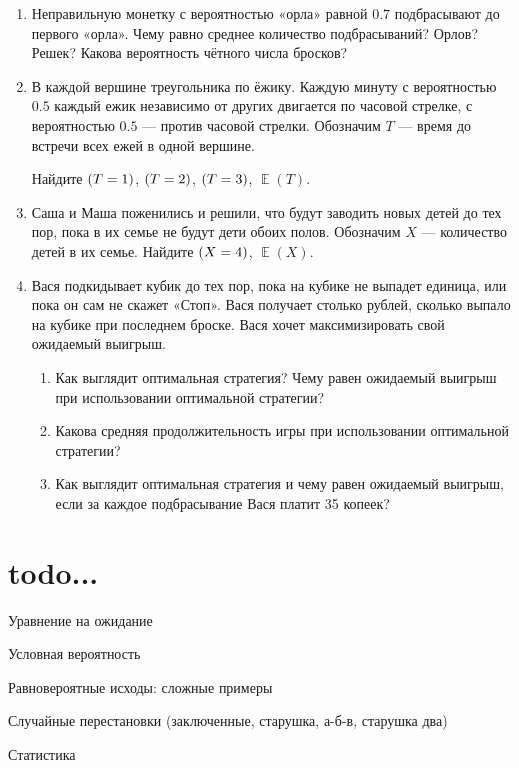 \documentclass[12pt]{article}
\DeclareMathOperator{\E}{\mathbb{E}}
\let\P\relax
\DeclareMathOperator{\P}{\mathbb{P}}
\theoremstyle{definition}
\begin{document}
\begin{enumerate}
\item  Неправильную монетку с вероятностью «орла» равной $0.7$ подбрасывают до первого «орла».
Чему равно среднее количество подбрасываний?  Орлов? Решек? Какова вероятность чётного числа бросков? 

\item В каждой вершине треугольника по ёжику. Каждую минуту с вероятностью $0.5$ каждый ежик
независимо от других двигается по часовой стрелке, с вероятностью
$0.5$ — против часовой стрелки.
Обозначим $T$ — время до встречи всех ежей в одной вершине.

Найдите $\P(T=1)$, $\P(T=2)$, $\P(T=3)$, $\E(T)$.

\item Саша и Маша поженились и решили, что будут заводить новых детей до тех пор,
пока в их семье не будут дети обоих полов. Обозначим $X$ — количество детей в их семье.
Найдите $\P(X=4)$, $\E(X)$.

\item Вася подкидывает кубик до тех пор, пока на кубике не выпадет единица, или пока он сам не скажет «Стоп». 
Вася получает столько рублей, сколько выпало на кубике при последнем броске. 
Вася хочет максимизировать свой ожидаемый выигрыш.
\begin{enumerate}
\item Как выглядит оптимальная стратегия? Чему равен ожидаемый выигрыш при использовании оптимальной стратегии?
\item Какова средняя продолжительность игры при использовании оптимальной стратегии?
\item Как выглядит оптимальная стратегия и чему равен ожидаемый выигрыш, если за каждое
подбрасывание Вася платит 35 копеек?
\end{enumerate}

\end{enumerate}
\newpage





\section{todo...}

Уравнение на ожидание

Условная вероятность

Равновероятные исходы: сложные примеры

Случайные перестановки (заключенные, старушка, а-б-в, старушка два)

Статистика
\end{document}
